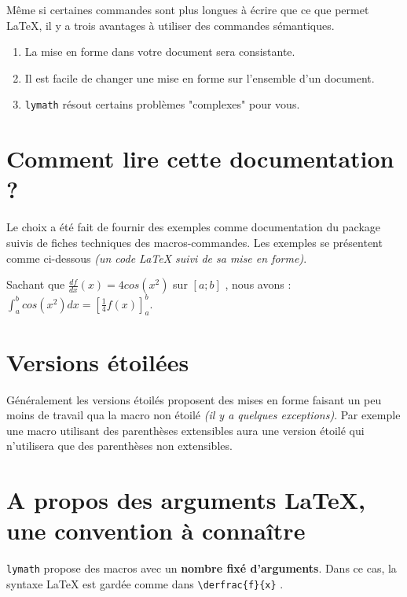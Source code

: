 \documentclass[12pt,a4paper]{scrartcl}
\theoremstyle{definition}
\begin{document}
Même si certaines commandes sont plus longues à écrire que ce que permet \LaTeX{}, il y a trois avantages à utiliser des commandes sémantiques.
\begin{enumerate}
	\item La mise en forme dans votre document sera consistante.

	\item Il est facile de changer une mise en forme sur l'ensemble d'un document.

	\item \verb+lymath+ résout certains problèmes "complexes" pour vous.
\end{enumerate}



\section{Comment lire cette documentation ?}

Le choix a été fait de fournir des exemples comme documentation du package suivis de fiches techniques des macros-commandes. Les exemples se présentent comme ci-dessous \textit{(un code \LaTeX{} suivi de sa mise en forme)}.

\begin{tcblisting}{}
Sachant que $\displaystyle \frac{df}{dx}(x) = 4 cos(x^2)$ sur $[a ; b]$ , nous avons :
$\displaystyle \int_a^b cos(x^2) dx = \left[ \frac{1}{4} f(x) \right]_a^b$.
\end{tcblisting}



\section{Versions étoilées}

Généralement les versions étoilés proposent des mises en forme faisant un peu moins de travail qua la macro non étoilé \textit{(il y a quelques exceptions)}. Par exemple une macro utilisant des parenthèses extensibles aura une version étoilé qui n'utilisera que des parenthèses non extensibles.



\section{A propos des arguments \LaTeX, une convention à connaître}

\verb+lymath+ propose des macros avec un \textbf{nombre fixé d'arguments}. Dans ce cas, la syntaxe \LaTeX{} est gardée comme dans \verb+\derfrac{f}{x}+ .
\end{document}
